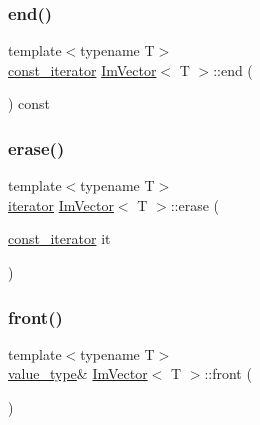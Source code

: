 \mbox{\label{class_im_vector_a06efa87357864d1c130f0f400eeccf8d}} 
\subsubsection{\texorpdfstring{end()}{end()}\hspace{0.1cm}{\footnotesize\ttfamily [2/2]}}
{\footnotesize\ttfamily template$<$typename T$>$ \\
\mbox{\hyperlink{class_im_vector_aedeac9c5080f9d6ce96ae837768ee4c4}{const\+\_\+iterator}} \mbox{\hyperlink{class_im_vector}{Im\+Vector}}$<$ T $>$\+::end (\begin{DoxyParamCaption}{ }\end{DoxyParamCaption}) const\hspace{0.3cm}{\ttfamily [inline]}}

\mbox{\label{class_im_vector_a1e1fd9b678be9d4b4432fbefde976045}} 
\subsubsection{\texorpdfstring{erase()}{erase()}}
{\footnotesize\ttfamily template$<$typename T$>$ \\
\mbox{\hyperlink{class_im_vector_a74b5478f1f6fd471cc71219bce483db6}{iterator}} \mbox{\hyperlink{class_im_vector}{Im\+Vector}}$<$ T $>$\+::erase (\begin{DoxyParamCaption}\item[{\mbox{\hyperlink{class_im_vector_aedeac9c5080f9d6ce96ae837768ee4c4}{const\+\_\+iterator}}}]{it }\end{DoxyParamCaption})\hspace{0.3cm}{\ttfamily [inline]}}

\mbox{\label{class_im_vector_a5b0108d6b1a4a11609723f8305fb9011}} 
\subsubsection{\texorpdfstring{front()}{front()}\hspace{0.1cm}{\footnotesize\ttfamily [1/2]}}
{\footnotesize\ttfamily template$<$typename T$>$ \\
\mbox{\hyperlink{class_im_vector_a8bd77e4e7581d8e5f9e98d7c2f3c2a80}{value\+\_\+type}}\& \mbox{\hyperlink{class_im_vector}{Im\+Vector}}$<$ T $>$\+::front (\begin{DoxyParamCaption}{ }\end{DoxyParamCaption})\hspace{0.3cm}{\ttfamily [inline]}}

